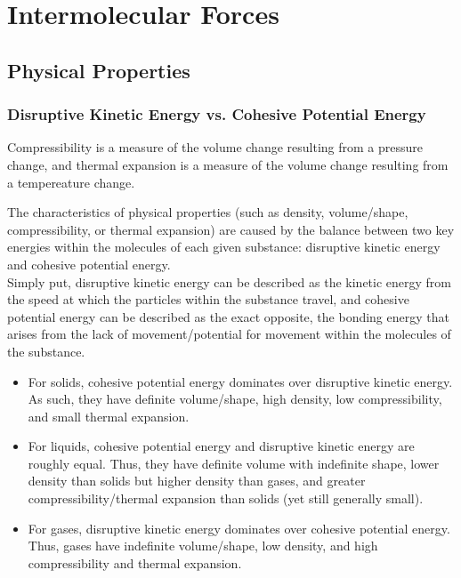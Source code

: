 \section{Intermolecular Forces}

\subsection{Physical Properties}

\subsubsection{Disruptive Kinetic Energy vs. Cohesive Potential Energy}

\begin{defn}
Compressibility is a measure of the volume change resulting from a pressure change, and thermal expansion is a measure of the volume change resulting from a tempereature change.
\end{defn}

\noindent
The characteristics of physical properties (such as density, volume/shape, compressibility, or thermal expansion) are caused by the balance between two key energies within the molecules of each given substance: disruptive kinetic energy and cohesive potential energy. \\

\noindent
Simply put, disruptive kinetic energy can be described as the kinetic energy from the speed at which the particles within the substance travel, and cohesive potential energy can be described as the exact opposite, the bonding energy that arises from the lack of movement/potential for movement within the molecules of the substance. \\

\begin{itemize}
\item For solids, cohesive potential energy dominates over disruptive kinetic energy. As such, they have definite volume/shape, high density, low compressibility, and small thermal expansion.
\item For liquids, cohesive potential energy and disruptive kinetic energy are roughly equal. Thus, they have definite volume with indefinite shape, lower density than solids but higher density than gases,  and greater compressibility/thermal expansion than solids (yet still generally small).
\item For gases, disruptive kinetic energy dominates over cohesive potential energy. Thus, gases have indefinite volume/shape, low density, and high compressibility and thermal expansion.
\end{itemize}

